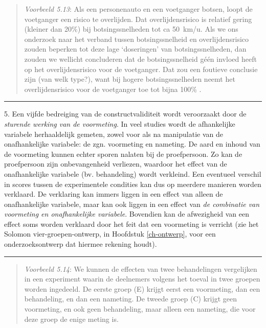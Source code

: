 \documentclass[
]{book}
\begin{document}
\begin{quote}
\emph{Voorbeeld 5.13}: Als een personenauto en een voetganger botsen,
loopt de voetganger een
risico te overlijden. Dat overlijdensrisico is relatief gering (kleiner
dan 20\%) bij botsingssnelheden tot ca 50~km/u. Als we ons onderzoek naar
het verband tussen botsingssnelheid en overlijdensrisico zouden beperken
tot deze lage `doseringen' van botsingssnelheden, dan zouden we wellicht
concluderen dat de botsingssnelheid géén invloed heeft op het
overlijdensrisico voor de voetganger. Dat zou een foutieve conclusie
zijn (van welk type?), want bij hogere botsingssnelheden neemt het
overlijdensrisico voor de voetganger toe tot bijna 100\%
\citep{Rosen11, SWOV12}.
\end{quote}

\begin{center}\rule{0.5\linewidth}{0.5pt}\end{center}

5. Een vijfde bedreiging van de constructvaliditeit wordt veroorzaakt
door de \emph{sturende werking van de voormeting}. In veel studies wordt de
afhankelijke variabele herhaaldelijk gemeten, zowel voor als na
manipulatie van de onafhankelijke variabele: de zgn. voormeting en
nameting. De aard en inhoud van de voormeting kunnen echter sporen
nalaten bij de proefpersoon. Zo kan de proefpersoon zijn onbevangenheid
verliezen, waardoor het effect van de onafhankelijke variabele (bv.
behandeling) wordt verkleind. Een eventueel verschil in scores tussen de
experimentele condities kan dus op meerdere manieren worden verklaard.
De verklaring kan immers liggen in een effect van alleen de
onafhankelijke variabele, maar kan ook liggen in een effect van \emph{de
combinatie van voormeting en onafhankelijke variabele}. Bovendien kan de
afwezigheid van een effect soms worden verklaard door het feit dat een
voormeting is verricht (zie het Solomon vier-groepen-ontwerp, in Hoofdstuk \ref{ch-ontwerp}, voor een onderzoeksontwerp dat
hiermee rekening houdt).

\begin{center}\rule{0.5\linewidth}{0.5pt}\end{center}

\begin{quote}
\emph{Voorbeeld 5.14}: We kunnen de effecten van twee behandelingen vergelijken in een
experiment waarin de deelnemers volgens het toeval in twee groepen
worden ingedeeld. De eerste groep (E) krijgt eerst een voormeting, dan
een behandeling, en dan een nameting. De tweede groep (C) krijgt geen
voormeting, en ook geen behandeling, maar alleen een nameting, die voor
deze groep de enige meting is.
\end{quote}
\end{document}
